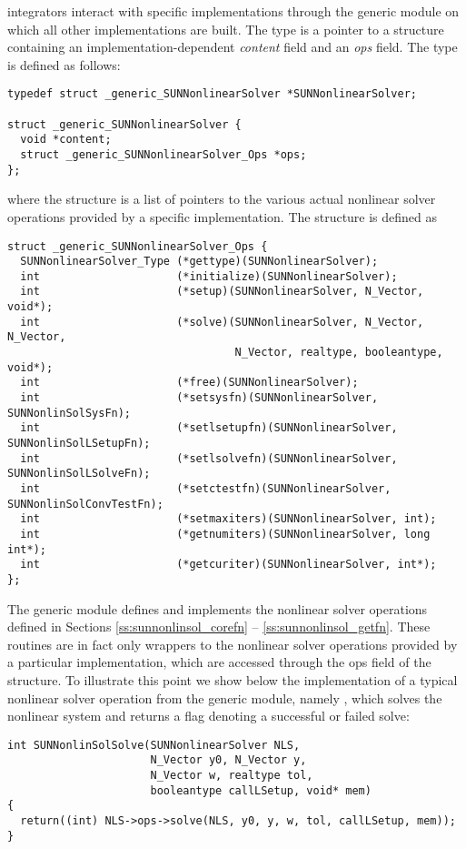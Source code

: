 {\sundials} integrators interact with specific {\sunnonlinsol}
implementations through the generic {\sunnonlinsol} module on which all
other {\sunnonlinsol} implementations are built. The
 type is a pointer to a structure containing an
implementation-dependent \textit{content} field and an \textit{ops}
field. The type  is defined as follows:
\begin{verbatim}
typedef struct _generic_SUNNonlinearSolver *SUNNonlinearSolver;

struct _generic_SUNNonlinearSolver {
  void *content;
  struct _generic_SUNNonlinearSolver_Ops *ops;
};
\end{verbatim}
where the  structure is a list of
pointers to the various actual nonlinear solver operations provided by a
specific implementation. The 
structure is defined as
\begin{verbatim}
struct _generic_SUNNonlinearSolver_Ops {
  SUNNonlinearSolver_Type (*gettype)(SUNNonlinearSolver);
  int                     (*initialize)(SUNNonlinearSolver);
  int                     (*setup)(SUNNonlinearSolver, N_Vector, void*);
  int                     (*solve)(SUNNonlinearSolver, N_Vector, N_Vector,
                                   N_Vector, realtype, booleantype, void*);
  int                     (*free)(SUNNonlinearSolver);
  int                     (*setsysfn)(SUNNonlinearSolver, SUNNonlinSolSysFn);
  int                     (*setlsetupfn)(SUNNonlinearSolver, SUNNonlinSolLSetupFn);
  int                     (*setlsolvefn)(SUNNonlinearSolver, SUNNonlinSolLSolveFn);
  int                     (*setctestfn)(SUNNonlinearSolver, SUNNonlinSolConvTestFn);
  int                     (*setmaxiters)(SUNNonlinearSolver, int);
  int                     (*getnumiters)(SUNNonlinearSolver, long int*);
  int                     (*getcuriter)(SUNNonlinearSolver, int*);
};
\end{verbatim}
The generic {\sunnonlinsol} module defines and implements the nonlinear
solver operations defined in Sections \ref{ss:sunnonlinsol_corefn}
-- \ref{ss:sunnonlinsol_getfn}. These routines are in fact only
wrappers to the nonlinear solver operations provided by a particular
{\sunnonlinsol} implementation, which are accessed through the ops
field of the  structure. To illustrate this
point we show below the implementation of a typical nonlinear solver
operation from the generic {\sunnonlinsol} module, namely
, which solves the nonlinear system and returns a flag
denoting a successful or failed solve:
\begin{verbatim}
int SUNNonlinSolSolve(SUNNonlinearSolver NLS,
                      N_Vector y0, N_Vector y,
                      N_Vector w, realtype tol,
                      booleantype callLSetup, void* mem)
{
  return((int) NLS->ops->solve(NLS, y0, y, w, tol, callLSetup, mem));
}
\end{verbatim}


